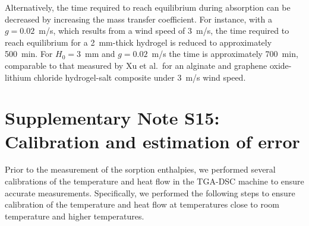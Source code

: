 \documentclass[11pt]{article}
\begin{document}
Alternatively, the time required to reach equilibrium during absorption can be decreased by increasing the mass transfer coefficient. For instance, with a $g=0.02$~m/s, which results from a wind speed of 3~m/s,\cite{diazmarin2024} the time required to reach equilibrium for a 2~mm-thick hydrogel is reduced to approximately 500~min. For $H_0=3$~mm and $g=0.02$~m/s the time is approximately 700~min, comparable to that measured by Xu et al.\ for an alginate and graphene oxide-lithium chloride hydrogel-salt composite under 3~m/s wind speed.\cite{xu2021}

\clearpage

\section*{Supplementary Note S15: Calibration and estimation of error}

Prior to the measurement of the sorption enthalpies, we performed several calibrations of the temperature and heat flow in the TGA-DSC machine to ensure accurate measurements. Specifically, we performed the following steps to ensure calibration of the temperature and heat flow at temperatures close to room temperature and higher temperatures.
\end{document}
